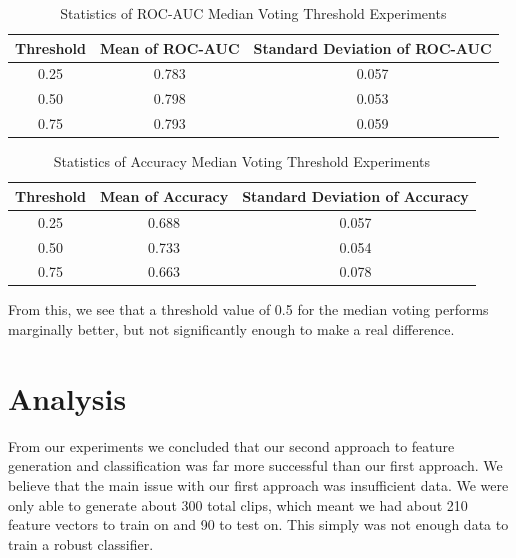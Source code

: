 \documentclass[10pt,twocolumn,letterpaper]{article}
\begin{document}
\begin{table}[h]
  \begin{center}
    \begin{adjustbox}{width=0.47\textwidth}
    \begin{tabular}{|c|c|c|}
      \textbf{Threshold} & \textbf{Mean of ROC-AUC} & \textbf{Standard Deviation of ROC-AUC} \\
      \hline 
      0.25 & 0.783 & 0.057  \\
      0.50 & 0.798 & 0.053  \\
      0.75 & 0.793 & 0.059  \\
    \end{tabular}
    \end{adjustbox}
    \caption{Statistics of ROC-AUC Median Voting Threshold Experiments}
    \label{tab:table4}
  \end{center}
\end{table}
\begin{table}[h]
  \begin{center}
    \begin{adjustbox}{width=0.47\textwidth}
    \begin{tabular}{|c|c|c|}
      \textbf{Threshold} & \textbf{Mean of Accuracy} & \textbf{Standard Deviation of Accuracy} \\
      \hline 
      0.25 & 0.688 & 0.057  \\
      0.50 & 0.733 & 0.054  \\
      0.75 & 0.663 & 0.078  \\
    \end{tabular}
    \end{adjustbox}
    \caption{Statistics of Accuracy Median Voting Threshold Experiments}
    \label{tab:table5}
  \end{center}
\end{table}

From this, we see that a threshold value of 0.5 for the median voting performs marginally better, but not significantly
enough to make a real difference.

\section{Analysis}
From our experiments we concluded that our second approach to feature generation and classification was
far more successful than our first approach. We believe that the main issue with our first approach was
insufficient data. We were only able to generate about 300 total clips, which meant we had about 210
feature vectors to train on and 90 to test on. This simply was not enough data to train a robust classifier.
\end{document}
